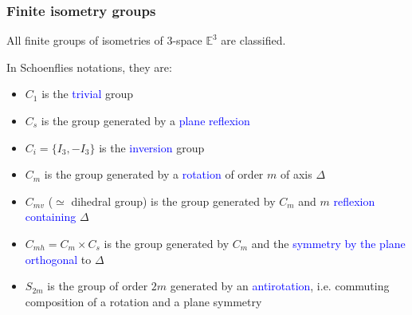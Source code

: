 \documentclass{beamer}
\begin{document}
\begin{frame}\frametitle{Finite isometry groups}
\vspace{-1mm}


All finite groups of isometries of $3$-space $\mathbb{E}^3$ are 
classified. 

In Schoenflies notations, they are:
\begin{itemize}
\item $C_1$ is the \textcolor{blue}{trivial} group
\item $C_s$ is the group generated by a \textcolor{blue}{plane reflexion}
\item $C_i=\{I_3, -I_3\}$ is the \textcolor{blue}{inversion} group
\item $C_m$ is the group generated by a \textcolor{blue}{rotation} of 
order 
$m$ of axis $\Delta$
\item $C_{mv}$ ($\simeq$ dihedral group) is the group generated by $C_m$ 
and $m$ \textcolor{blue}{reflexion containing} $\Delta$
\item $C_{mh}=C_m\times C_s$ is the group generated by $C_m$ and the 
\textcolor{blue}{symmetry by the plane orthogonal} to $\Delta$
\item $S_{2m}$ is the group of order $2m$ generated by an 
\textcolor{blue}{antirotation}, i.e. commuting composition of a rotation
and a plane symmetry
\end{itemize}
\end{frame}
\end{document}
